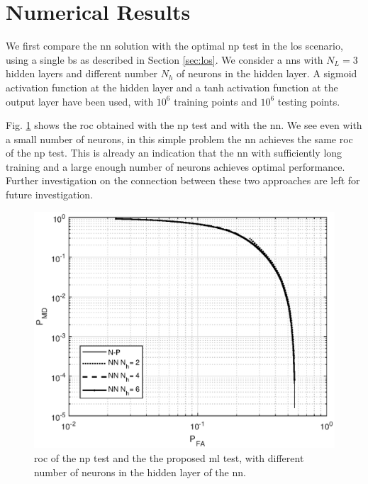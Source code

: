 \documentclass[conference]{IEEEtran}
\begin{document}

\section{Numerical Results}\label{sec: nr}

We first compare the \ac{nn} solution with the optimal \ac{np} test in the \ac{los} scenario, using a single \ac{bs} as described in Section \ref{sec:los}. We consider a \acp{nn} with $N_L=3$ hidden layers and different number $N_h$ of neurons in the hidden layer. A sigmoid activation function at the hidden layer and a tanh activation function at the output layer have been used, with $10^6$ training points  and $10^6$ testing points. 

Fig. \ref{fig:NP_comp} shows the \ac{roc} obtained with the \ac{np} test and with the \ac{nn}. We see even with a small number of neurons, in this simple problem the \ac{nn} achieves the same \ac{roc} of the \ac{np} test. This is already an indication that the \ac{nn} with sufficiently long training and a large enough number of neurons achieves optimal performance. Further investigation on the connection between these two approaches are left for future  investigation.
 
 \begin{figure}[h]
     \centering
     \includegraphics[width=0.9\columnwidth]{FA_MD_LOS.eps}
     \caption{\ac{roc} of the \ac{np} test and the the proposed \ac{ml} test,  with different number of neurons in the hidden layer of the \ac{nn}.}
     \label{fig:NP_comp}
 \end{figure}
\end{document}
